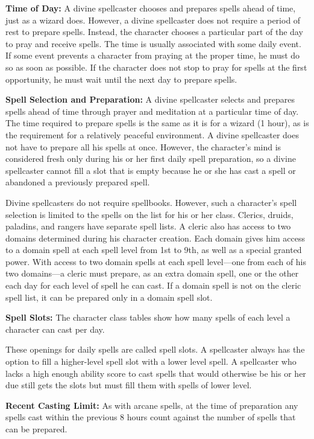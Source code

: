 \documentclass{article}
\begin{document}
\textbf{Time of Day:} A divine spellcaster chooses and prepares spells ahead of 
time, just as a wizard does. However, a divine spellcaster does not require a period 
of rest to prepare spells. Instead, the character chooses a particular part of 
the day to pray and receive spells. The time is usually associated with some daily 
event. If some event prevents a character from praying at the proper time, he must 
do so as soon as possible. If the character does not stop to pray for spells at 
the first opportunity, he must wait until the next day to prepare spells.

\textbf{Spell Selection and Preparation:} A divine spellcaster selects and prepares 
spells ahead of time through prayer and meditation at a particular time of day. 
The time required to prepare spells is the same as it is for a wizard (1 hour), 
as is the requirement for a relatively peaceful environment. A divine spellcaster 
does not have to prepare all his spells at once. However, the character's mind 
is considered fresh only during his or her first daily spell preparation, so a 
divine spellcaster cannot fill a slot that is empty because he or she has cast 
a spell or abandoned a previously prepared spell.

Divine spellcasters do not require spellbooks. However, such a character's spell 
selection is limited to the spells on the list for his or her class. Clerics, druids, 
paladins, and rangers have separate spell lists. A cleric also has access to two 
domains determined during his character creation. Each domain gives him access 
to a domain spell at each spell level from 1st to 9th, as well as a special granted 
power. With access to two domain spells at each spell level---one from each of 
his two domains---a cleric must prepare, as an extra domain spell, one or the other 
each day for each level of spell he can cast. If a domain spell is not on the cleric 
spell list, it can be prepared only in a domain spell slot.

\textbf{Spell Slots:} The character class tables show how many spells of each level 
a character can cast per day.

These openings for daily spells are called spell slots. A spellcaster always has 
the option to fill a higher-level spell slot with a lower level spell. A spellcaster 
who lacks a high enough ability score to cast spells that would otherwise be his 
or her due still gets the slots but must fill them with spells of lower level. 

\textbf{Recent Casting Limit:} As with arcane spells, at the time of preparation 
any spells cast within the previous 8 hours count against the number of spells 
that can be prepared.
\end{document}
